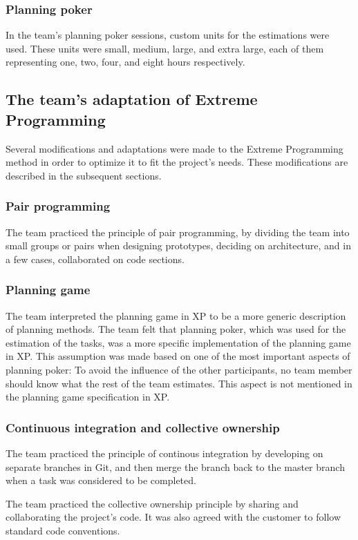 \subsubsection{Planning poker}
In the team's planning poker sessions, custom units for the estimations were used. These units were small, medium, large, and extra large, each of them representing one, two, four, and eight hours respectively.

\subsection{The team's adaptation of Extreme Programming}
\label{sec:adapExtremeProgr}
Several modifications and adaptations were made to the Extreme Programming method in order to optimize it to fit the project's needs. These modifications are described in the subsequent sections.

\subsubsection{Pair programming}
The team practiced the principle of pair programming, by dividing the team into small groups or pairs when designing prototypes, deciding on architecture, and in a few cases, collaborated on code sections.

\subsubsection{Planning game}
The team interpreted the planning game in XP to be a more generic description of planning methods. The team felt that planning poker, which was used for the estimation of the tasks, was a more specific implementation of the planning game in XP. This assumption was made based on one of the most important aspects of planning poker: To avoid the influence of the other participants, no team member should know what the rest of the team estimates. This aspect is not mentioned in the planning game specification in XP.

\subsubsection{Continuous integration and collective ownership}
The team practiced the principle of continous integration by developing on separate branches in Git, and then merge the branch back to the master branch when a task was considered to be completed.

The team practiced the collective ownership principle by sharing and collaborating the project's code. It was also agreed with the customer to follow standard code conventions.

